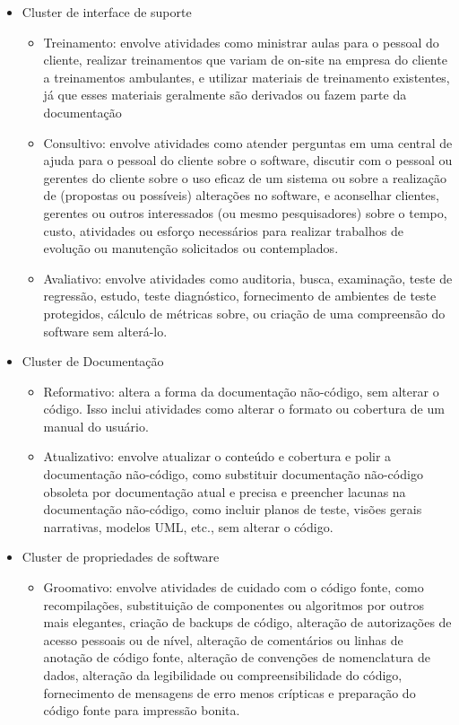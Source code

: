 \begin{itemize}
    \item Cluster de interface de suporte
    \begin{itemize}
        \item Treinamento: envolve atividades como ministrar aulas para o pessoal do cliente, realizar treinamentos que variam de on-site na empresa do cliente a treinamentos ambulantes, e utilizar materiais de treinamento existentes, já que esses materiais geralmente são derivados ou fazem parte da documentação
        \item Consultivo: envolve atividades como atender perguntas em uma central de ajuda para o pessoal do cliente sobre o software, discutir com o pessoal ou gerentes do cliente sobre o uso eficaz de um sistema ou sobre a realização de (propostas ou possíveis) alterações no software, e aconselhar clientes, gerentes ou outros interessados (ou mesmo pesquisadores) sobre o tempo, custo, atividades ou esforço necessários para realizar trabalhos de evolução ou manutenção solicitados ou contemplados.
        \item Avaliativo: envolve atividades como auditoria, busca, examinação, teste de regressão, estudo, teste diagnóstico, fornecimento de ambientes de teste protegidos, cálculo de métricas sobre, ou criação de uma compreensão do software sem alterá-lo.
    \end{itemize}
    \item Cluster de Documentação
    \begin{itemize}
        \item Reformativo: altera a forma da documentação não-código, sem alterar o código. Isso inclui atividades como alterar o formato ou cobertura de um manual do usuário.
        \item Atualizativo: envolve atualizar o conteúdo e cobertura e polir a documentação não-código, como substituir documentação não-código obsoleta por documentação atual e precisa e preencher lacunas na documentação não-código, como incluir planos de teste, visões gerais narrativas, modelos UML, etc., sem alterar o código.
    \end{itemize}
    \item Cluster de propriedades de software
    \begin{itemize}
        \item Groomativo: envolve atividades de cuidado com o código fonte, como recompilações, substituição de componentes ou algoritmos por outros mais elegantes, criação de backups de código, alteração de autorizações de acesso pessoais ou de nível, alteração de comentários ou linhas de anotação de código fonte, alteração de convenções de nomenclatura de dados, alteração da legibilidade ou compreensibilidade do código, fornecimento de mensagens de erro menos crípticas e preparação do código fonte para impressão bonita.

\end{itemize}
\end{itemize}
